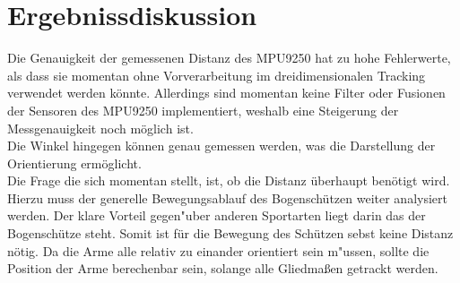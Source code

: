 \chapter{Ergebnissdiskussion}
Die Genauigkeit der gemessenen Distanz des MPU9250 hat zu hohe Fehlerwerte, als 
dass sie momentan ohne Vorverarbeitung im dreidimensionalen Tracking verwendet werden könnte.
Allerdings sind momentan keine Filter oder Fusionen der Sensoren des MPU9250 implementiert,
weshalb eine Steigerung der Messgenauigkeit noch möglich ist.\\
Die Winkel hingegen können genau gemessen werden, was die Darstellung der Orientierung 
ermöglicht.\\
Die Frage die sich momentan stellt, ist, ob die Distanz überhaupt benötigt wird. Hierzu 
muss der generelle Bewegungsablauf des Bogenschützen weiter analysiert werden. Der klare
Vorteil gegen"uber anderen Sportarten liegt darin das der Bogenschütze steht. Somit ist 
für die Bewegung des Schützen sebst keine Distanz nötig. Da die Arme alle relativ zu 
einander orientiert sein m"ussen, sollte die Position der Arme berechenbar sein, solange 
alle Gliedmaßen getrackt werden.